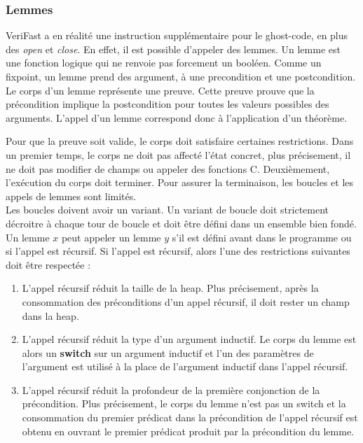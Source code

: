 \documentclass[9pt,openany]{book}
\newcommand{\verifast}{VeriFast}
\begin{document}
			\subsubsection{Lemmes}
			\verifast{} a en r\'ealit\'e une instruction suppl\'ementaire pour le ghost-code, en plus des \textit{open} et \textit{close}. En effet, il est possible d'appeler des lemmes. Un lemme est une fonction logique qui ne renvoie pas forcement un bool\'een. Comme un fixpoint, un lemme prend des argument, \`a une precondition et une postcondition. Le corps d'un lemme repr\'esente une preuve. Cette preuve prouve que la pr\'econdition implique la postcondition pour toutes les valeurs possibles des arguments. L'appel d'un lemme correspond donc \`a l'application d'un th\'eor\`eme.\par
			Pour que la preuve soit valide, le corps doit satisfaire certaines restrictions. Dans un premier temps, le corps ne doit pas affect\'e l'\'etat concret, plus pr\'ecisement, il ne doit pas modifier de champs ou appeler des fonctions C. Deuxi\`emement, l'ex\'ecution du corps doit terminer. Pour assurer la terminaison, les boucles et les appels de lemmes sont limit\'es. \\
			Les boucles doivent avoir un variant. Un variant de boucle doit strictement d\'ecroitre  \`a chaque tour de boucle et doit \^etre d\'efini dans un ensemble bien fond\'e.\\
			Un lemme $x$ peut appeler un lemme $y$ s'il est d\'efini avant dans le programme ou si l'appel est r\'ecursif. Si l'appel est r\'ecursif, alors l'une des restrictions suivantes doit \^etre respect\'ee :
			\begin{enumerate}
			\item L'appel r\'ecursif r\'eduit la taille de la heap. Plus pr\'ecisement, apr\`es la consommation des pr\'econditions d'un appel r\'ecursif, il doit rester un champ dans la heap.
			\item L'appel r\'ecursif r\'eduit la type d'un argument inductif. Le corps du lemme est alors un \textbf{switch} sur un argument inductif et l'un des param\`etres de l'argument est utilis\'e \`a la place de l'argument inductif dans l'appel r\'ecursif.
			\item L'appel r\'ecursif r\'eduit la profondeur de la premi\`ere conjonction de la pr\'econdition. Plus pr\'ecisement, le corps du lemme n'est pas un switch et la consommation du premier pr\'edicat dans la pr\'econdition de l'appel r\'ecursif est obtenu en ouvrant le premier pr\'edicat produit par la pr\'econdition du lemme.
			\end{enumerate}
				
\end{document}
